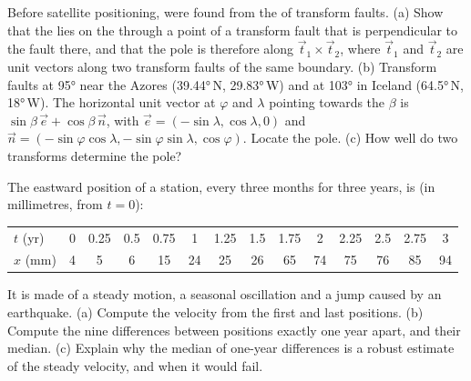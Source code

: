 \begin{exercise}[$\star\star\star$]\label{exo:b1:plate-kinematics:11}
Before satellite positioning,  were found from the  of
transform faults. (a) Show that the  lies on the  through
a point of a transform fault that is perpendicular to the fault there, and that
the pole is therefore along $\vec t_1\times\vec t_2$, where $\vec t_1$ and
$\vec t_2$ are unit vectors along two transform faults of the same boundary.
(b) Transform faults  at \ang{95} near the Azores 
(\ang{39.44}\,N, \ang{29.83}\,W) and at \ang{103} in Iceland (\ang{64.5}\,N,
\ang{18}\,W). The horizontal unit vector at  $\varphi$ and 
$\lambda$ pointing towards the  $\beta$ is $\sin\beta\,\vec e +
\cos\beta\,\vec n$, with $\vec e = (-\sin\lambda, \cos\lambda, 0)$ and $\vec n =
(-\sin\varphi\cos\lambda, -\sin\varphi\sin\lambda, \cos\varphi)$. Locate the
pole. (c) How well do two transforms determine the pole?
\end{exercise}

\begin{exercise}[$\star\star\star$]\label{exo:b1:plate-kinematics:12}
The eastward position of a station, every three months for three years, is
(in millimetres, from $t = 0$):
\begin{center}\small
\begin{tabular}{l*{13}{c}}
\hline
$t$ (yr) & 0 & 0.25 & 0.5 & 0.75 & 1 & 1.25 & 1.5 & 1.75 & 2 & 2.25 & 2.5 & 2.75 & 3\\
$x$ (mm) & 4 & 5 & 6 & 15 & 24 & 25 & 26 & 65 & 74 & 75 & 76 & 85 & 94\\
\hline
\end{tabular}
\end{center}
It is made of a steady motion, a seasonal oscillation and a jump caused by an
earthquake. (a) Compute the velocity from the first and last positions.
(b) Compute the nine differences between positions exactly one year apart, and
their median. (c) Explain why the median of one-year differences is a robust
estimate of the steady velocity, and when it would fail.
\end{exercise}

